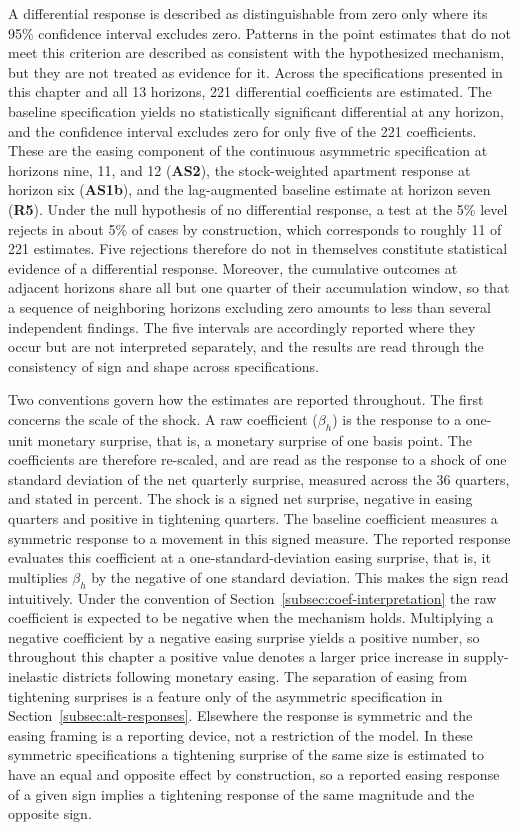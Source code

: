 \documentclass[a4paper,12pt, headsepline]{scrartcl}
\numberwithin{equation}{section}
\begin{document}
A differential response is described as distinguishable from zero only where its 95\% confidence interval excludes zero. Patterns in the point estimates that do not meet this criterion are described as consistent with the hypothesized mechanism, but they are not treated as evidence for it. Across the specifications presented in this chapter and all 13 horizons, 221 differential coefficients are estimated. The baseline specification yields no statistically significant differential at any horizon, and the confidence interval excludes zero for only five of the 221 coefficients. These are the easing component of the continuous asymmetric specification at horizons nine, 11, and 12 (\textbf{AS2}), the stock-weighted apartment response at horizon six (\textbf{AS1b}), and the lag-augmented baseline estimate at horizon seven (\textbf{R5}). Under the null hypothesis of no differential response, a test at the 5\% level rejects in about 5\% of cases by construction, which corresponds to roughly 11 of 221 estimates. Five rejections therefore do not in themselves constitute statistical evidence of a differential response. Moreover, the cumulative outcomes at adjacent horizons share all but one quarter of their accumulation window, so that a sequence of neighboring horizons excluding zero amounts to less than several independent findings. The five intervals are accordingly reported where they occur but are not interpreted separately, and the results are read through the consistency of sign and shape across specifications.

Two conventions govern how the estimates are reported throughout. The first concerns the scale of the shock. A raw coefficient ($\beta_h$) is the response to a one-unit monetary surprise, that is, a monetary surprise of one basis point. The coefficients are therefore re-scaled, and are read as the response to a shock of one standard deviation of the net quarterly surprise, measured across the 36 quarters, and stated in percent. The shock is a signed net surprise, negative in easing quarters and positive in tightening quarters. The baseline coefficient measures a symmetric response to a movement in this signed measure. The reported response evaluates this coefficient at a one-standard-deviation easing surprise, that is, it multiplies $\beta_h$ by the negative of one standard deviation. This makes the sign read intuitively. Under the convention of Section~\ref{subsec:coef-interpretation} the raw coefficient is expected to be negative when the mechanism holds. Multiplying a negative coefficient by a negative easing surprise yields a positive number, so throughout this chapter a positive value denotes a larger price increase in supply-inelastic districts following monetary easing. The separation of easing from tightening surprises is a feature only of the asymmetric specification in Section~\ref{subsec:alt-responses}. Elsewhere the response is symmetric and the easing framing is a reporting device, not a restriction of the model. In these symmetric specifications a tightening surprise of the same size is estimated to have an equal and opposite effect by construction, so a reported easing response of a given sign implies a tightening response of the same magnitude and the opposite sign.
\end{document}
